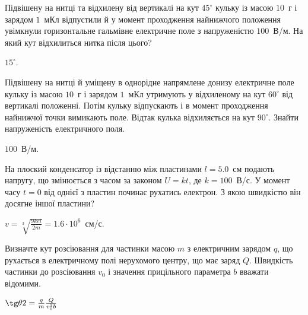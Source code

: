 \begin{problem}%
    Підвішену на нитці та відхилену від вертикалі на кут $45^\circ$ кульку із масою $10$~г і зарядом $1$~мКл відпустили й у момент проходження найнижчого положення увімкнули горизонтальне гальмівне електричне поле з напруженістю
    $100$~В/м. На який кут відхилиться нитка після цього?
\begin{solution}
    $15^\circ$.
\end{solution}
\end{problem}

\begin{problem}%
    Підвішену на нитці й уміщену в однорідне напрямлене донизу електричне поле кульку із масою $10$~г і зарядом $1$~мКл утримують у відхиленому на
    кут $60^\circ$ від вертикалі положенні. Потім кульку відпускають і в момент проходження найнижчої точки вимикають поле. Відтак кулька відхиляється на
    кут $90^\circ$. Знайти напруженість електричного поля.
\begin{solution}
    $100$~В/м.
\end{solution}
\end{problem}


\begin{problem}%
    На плоский конденсатор із відстанню між пластинами $l = 5.0$~см подають напругу, що змінюється з часом за законом $U = kt$, де $k = 100$~В/с. У момент часу $t = 0$ від однієї з пластин починає рухатись електрон. З якою швидкістю він досягне іншої пластини?
\begin{solution}
    $v = \sqrt[3]{\frac{9kel}{2m}} = 1.6\cdot10^6$~см/с.
\end{solution}
\end{problem}



\begin{problem}
    Визначте кут розсіювання для частинки масою $m$ з електричним зарядом $q$, що рухається в електричному полі нерухомого центру, що має заряд $Q$. Швидкість частинки до розсіювання $v_0$ і значення прицільного
    параметра $b$ вважати відомими.
\begin{solution}
	$\tg\theta2 = \frac qm\frac{Q}{v_0^2b}$
\end{solution}
\end{problem}

